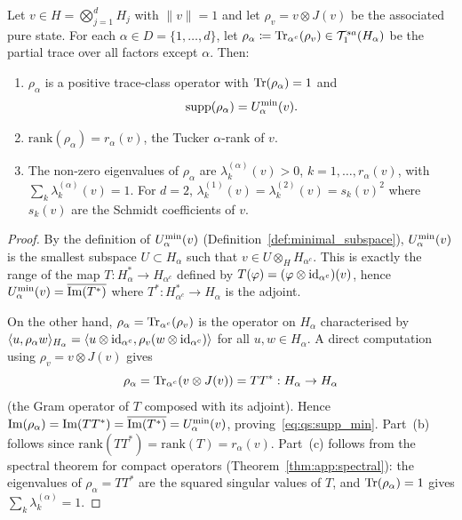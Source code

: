 \begin{theorem}
\label{thm:qs:minimal_partial_trace}
Let $v \in H = \bigotimes_{j=1}^d H_j$ with $\|v\|=1$ and let
$\rho_v = v \otimes J(v)$ be the associated pure state. For each
$\alpha \in D = \{1, \ldots, d\}$, let
$\rho_\alpha \coloneqq \mathrm{Tr}_{\alpha^c}(\rho_v) \in \mathcal{T}_{1}^{sa}(H_\alpha)$
be the partial trace over all factors except $\alpha$. Then:
\begin{enumerate}
\item[\textup{(a)}] $\rho_\alpha$ is a positive trace-class operator
    with $\mathrm{Tr}(\rho_\alpha) = 1$ and
    \begin{equation}
    \label{eq:qs:supp_min}
        \mathrm{supp}(\rho_\alpha) = U^{\min}_{\alpha}(v).
    \end{equation}
\item[\textup{(b)}] $\mathrm{rank}(\rho_\alpha) = r_\alpha(v)$,
    the Tucker $\alpha$-rank of $v$.
\item[\textup{(c)}] The non-zero eigenvalues of $\rho_\alpha$ are
    $\lambda_k^{(\alpha)}(v) > 0$, $k = 1, \ldots, r_\alpha(v)$,
    with $\sum_k \lambda_k^{(\alpha)}(v) = 1$.
    For $d=2$, $\lambda_k^{(1)}(v) = \lambda_k^{(2)}(v) = s_k(v)^2$
    where $s_k(v)$ are the Schmidt coefficients of $v$.
\end{enumerate}
\end{theorem}

\begin{proof}
By the definition of $U^{\min}_{\alpha}(v)$ (Definition~\ref{def:minimal_subspace}),
$U^{\min}_{\alpha}(v)$ is the smallest subspace $U \subset H_\alpha$ such
that $v \in U \otimes_H H_{\alpha^c}$. This is exactly the range of the
map $T: H_\alpha^* \to H_{\alpha^c}$ defined by $T(\varphi) = (\varphi
\otimes \mathrm{id}_{\alpha^c})(v)$, hence $U^{\min}_{\alpha}(v) =
\overline{\mathrm{Im}(T^*)}$ where $T^*: H_{\alpha^c}^* \to H_\alpha$
is the adjoint.

On the other hand, $\rho_\alpha = \mathrm{Tr}_{\alpha^c}(\rho_v)$ is the
operator on $H_\alpha$ characterised by
$\langle u, \rho_\alpha w\rangle_{H_\alpha} = \langle u \otimes
\mathrm{id}_{\alpha^c}, \rho_v (w \otimes \mathrm{id}_{\alpha^c})\rangle$ for all
$u, w \in H_\alpha$. A direct computation using
$\rho_v = v \otimes J(v)$ gives
\begin{equation*}
    \rho_\alpha = \mathrm{Tr}_{\alpha^c}(v \otimes J(v))
    = T T^*: H_\alpha \to H_\alpha
\end{equation*}
(the Gram operator of $T$ composed with its adjoint). Hence
$\mathrm{Im}(\rho_\alpha) = \mathrm{Im}(TT^*) = \overline{\mathrm{Im}(T^*)}
= U^{\min}_{\alpha}(v)$, proving~\eqref{eq:qs:supp_min}.
Part~(b) follows since $\mathrm{rank}(TT^*) = \mathrm{rank}(T) = r_\alpha(v)$.
Part~(c) follows from the spectral theorem for compact operators
(Theorem~\ref{thm:app:spectral}): the eigenvalues of $\rho_\alpha = TT^*$
are the squared singular values of $T$, and $\mathrm{Tr}(\rho_\alpha) = 1$
gives $\sum_k \lambda_k^{(\alpha)} = 1$.
\end{proof}

